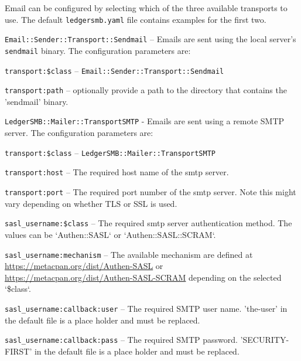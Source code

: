 Email  can be configured by selecting which of the three available transports to use. The default \texttt{ledgersmb.yaml} file contains examples for the first two.

\begin{description}
    
    \item{\texttt{Email::Sender::Transport::Sendmail}} – Emails are sent using the local server's \texttt{sendmail}  binary. The configuration parameters are:
    \begin{description}
        \item{\texttt{transport:\$class}} – \texttt{Email::Sender::Transport::Sendmail}
        \item{\texttt{transport:path}} – optionally provide a path to the directory that contains the 'sendmail' binary.
    \end{description}
    
    \item{\texttt{LedgerSMB::Mailer::TransportSMTP}} - Emails  are sent using a remote SMTP  server.  The configuration parameters are:
    \begin{description}
        \item{\texttt{transport:\$class}} – \texttt{LedgerSMB::Mailer::TransportSMTP}
        \item {\texttt{transport:host}} – The required host name of the smtp  server.
        \item {\texttt{transport:port}} – The required port number of the smtp server. Note this might vary depending on whether TLS or SSL is used.
        \item {\texttt{sasl\_username:\$class}} – The required smtp server authentication method. The values can be `Authen::SASL` or `Authen::SASL::SCRAM`.
        \item {\texttt{sasl\_username:mechanism}} –  The available mechanism are defined at\\
         	\url{https://metacpan.org/dist/Authen-SASL} or \\
         	\url{ https://metacpan.org/dist/Authen-SASL-SCRAM} depending on the selected `\$class`.
        \item {\texttt{sasl\_username:callback:user}} – The required SMTP user name.   'the-user' in the default file is a place holder and must be replaced.
        \item {\texttt{sasl\_username:callback:pass}} – The required SMTP password.  'SECURITY-FIRST' in the default file is a place holder and must be replaced.
    \end{description}
    

\end{description}
